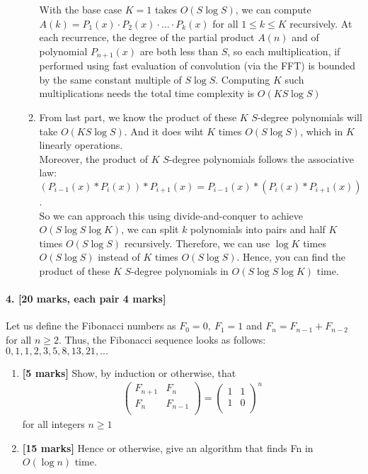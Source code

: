 \documentclass[a4paper]{scrartcl}
\begin{document}
\begin{enumerate}[label=(\alph*)]
\begin{enumerate}[label=(\roman*)]
  With the base case $K=1$ takes $O(S\log{S})$, we can compute $A(k)=P_1(x) \cdot P_2(x) \cdot ... \cdot P_k(x)$ for all $1 \leq k \leq K$ recursively.
  At each recurrence, the degree of the partial product $A(n)$ and of polynomial $P_{n+1}(x)$ are both less than $S$, so each multiplication, if performed using fast evaluation of convolution (via the FFT) is bounded by the same constant multiple of $S\log{S}$. Computing $K$ such multiplications needs the total time complexity is $O(KS\log{S})$\\
  \item From last part, we know the product of these $K$ $S$-degree polynomials will take $O(KS\log{S})$. And it does wiht $K$ times $O(S\log{S})$, which in $K$ linearly operations.\\
  Moreover, the product of $K$ $S$-degree polynomials follows the associative law:\\
  $(P_{i-1}(x)*P_i(x))*P_{i+1}(x)=P_{i-1}(x)*(P_i(x)*P_{i+1}(x))$.\\
  So we can approach this using divide-and-conquer to achieve $O(S\log{S}\log{K})$, we can split $k$ polynomials into pairs and half $K$ times $O(S\log{S})$ recursively. Therefore, we can use $\log{K}$ times $O(S\log{S})$ instead of $K$ times $O(S\log{S})$.
  Hence, you can find the product of these $K$ $S$-degree polynomials in $O(S\log{S}\log{K})$ time.
\end{enumerate}
\end{enumerate}
\paragraph{4. [20 marks, each pair 4 marks]}
\label{sec:Question 4}
Let us define the Fibonacci numbers as $F_0=0,\ F_1=1$ and $F_n=F_{n-1}+F_{n-2}$ for all $n\geq2$. Thus, the Fibonacci sequence looks as follows: $0, 1, 1, 2, 3, 5, 8, 13, 21, . . .$
\begin{enumerate}[label=(\alph*)]
  \item{\bfseries[5 marks]} Show, by induction or otherwise, that
\begin{align*}
  \begin{pmatrix}
   F_{n+1} & F_n \\
   F_n & F_{n-1} \\
  \end{pmatrix}
  =
  \begin{pmatrix}
    1 & 1 \\
    1 & 0 \\
  \end{pmatrix}^{\!n}
\end{align*}
  for all integers $n\geq1$
  \item {\bfseries[15 marks]} Hence or otherwise, give an algorithm that finds Fn in $O(\log{n})$ time.
\end{enumerate}
\end{document}

